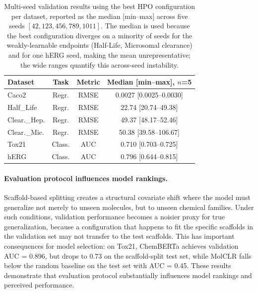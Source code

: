 \documentclass[journal]{IEEEtran}
\begin{document}
\begin{table}[!t]
\centering
\caption{Multi-seed validation results using the best HPO configuration per dataset, reported as the median [min--max] across five seeds $[42, 123, 456, 789, 1011]$. The median is used because the best configuration diverges on a minority of seeds for the weakly-learnable endpoints (Half-Life, Microsomal clearance) and for one hERG seed, making the mean unrepresentative; the wide ranges quantify this across-seed instability.}
\label{tab:multiseed}
\small
\setlength{\tabcolsep}{4pt}
\begin{tabular}{lccc}
\toprule
\textbf{Dataset} & \textbf{Task} & \textbf{Metric} & \textbf{Median [min--max], $n$=5} \\
\midrule
Caco2 & Regr. & RMSE & 0.0027 [0.0025--0.0030] \\
Half\_Life & Regr. & RMSE & 22.74 [20.74--49.38] \\
Clear.\_Hep. & Regr. & RMSE & 49.37 [48.17--52.46] \\
Clear.\_Mic. & Regr. & RMSE & 50.38 [39.58--106.67] \\
Tox21 & Class. & AUC & 0.710 [0.703--0.725] \\
hERG & Class. & AUC & 0.796 [0.644--0.815] \\
\bottomrule
\end{tabular}
\end{table}

\paragraph{Evaluation protocol influences model rankings.}
Scaffold-based splitting creates a structural covariate shift where the model must generalize not merely to unseen molecules, but to unseen chemical families. Under such conditions, validation performance becomes a noisier proxy for true generalization, because a configuration that happens to fit the specific scaffolds in the validation set may not transfer to the test scaffolds. This has important consequences for model selection: on Tox21, ChemBERTa achieves validation AUC = 0.896, but drops to 0.73 on the scaffold-split test set, while MolCLR falls below the random baseline on the test set with AUC = 0.45. These results demonstrate that evaluation protocol substantially influences model rankings and perceived performance.
\end{document}
